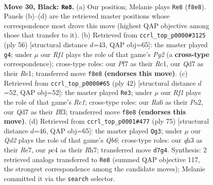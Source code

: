\documentclass[11pt]{article}
\begin{document}
\clearpage

\begin{figure}[p]\centering
\begin{subfigure}{0.46\textwidth}\centering
\resizebox{\linewidth}{!}{%
\newchessgame
\chessboard[
  setfen={5rk1/2pq1p2/r6p/2p1p1p1/2P1P1P1/3P3Q/7K/1NB2R2 b - - 17 30},
  showmover=false,
  pgfstyle=straightmove, color=movearrow, markmove={f8-e8}
]}
\caption{}
\end{subfigure}\hfill
\begin{subfigure}{0.46\textwidth}\centering
\resizebox{\linewidth}{!}{%
\newchessgame
\chessboard[
  setfen={r3qk2/p5p1/np6/4bp2/1P2p2Q/P7/5PPP/2R1R1K1 w - - 0 29},
  showmover=false,
  pgfstyle=straightmove, color=movearrow, markmove={g2-g4}
]}
\caption{}
\end{subfigure}
\\[4pt]
\begin{subfigure}{0.46\textwidth}\centering
\resizebox{\linewidth}{!}{%
\newchessgame
\chessboard[
  setfen={1k1r4/1pqb2pp/p4p2/3p4/3Q1PP1/2P2B2/PP5P/1K2R3 w - - 1 22},
  showmover=false,
  pgfstyle=straightmove, color=movearrow, markmove={e1-e3}
]}
\caption{}
\end{subfigure}\hfill
\begin{subfigure}{0.46\textwidth}\centering
\resizebox{\linewidth}{!}{%
\newchessgame
\chessboard[
  setfen={5k2/1p2rp1r/p5p1/3PP3/5QBp/1q5P/6P1/2R4K b - - 0 38},
  showmover=false,
  pgfstyle=straightmove, color=movearrow, markmove={b3-g3}
]}
\caption{}
\end{subfigure}
\caption{\textbf{Move 30, Black: \texttt{Re8}.} (a) Our position; Melanie plays \texttt{Re8} (\texttt{f8e8}). Panels (b)--(d) are the retrieved master positions whose correspondence most drove this move (highest QAP objective among those that transfer to it). (b) Retrieved from \texttt{ccrl\_top\_p0000\#3125} (ply 56) [structural distance $d$=43, QAP obj=65]: the master played \texttt{g4}; under $\mu$ our \emph{Rf1} plays the role of that game's \emph{Pg2} (a \textbf{cross-type} correspondence); cross-type roles: our \emph{P}f7 as their \emph{R}c1, our \emph{Q}d7 as their \emph{R}e1; transferred move \texttt{f8e8} \textbf{(endorses this move)}. (c) Retrieved from \texttt{ccrl\_top\_p0000\#65} (ply 42) [structural distance $d$=52, QAP obj=52]: the master played \texttt{Re3}; under $\mu$ our \emph{Rf1} plays the role of that game's \emph{Re1}; cross-type roles: our \emph{R}a6 as their \emph{P}a2, our \emph{Q}d7 as their \emph{B}f3; transferred move \texttt{f8e8} \textbf{(endorses this move)}. (d) Retrieved from \texttt{ccrl\_top\_p0001\#477} (ply 75) [structural distance $d$=46, QAP obj=65]: the master played \texttt{Qg3}; under $\mu$ our \emph{Qd2} plays the role of that game's \emph{Qb6}; cross-type roles: our \emph{q}h3 as their \emph{R}e7, our \emph{p}c4 as their \emph{R}h7; transferred move \texttt{d7g4}. Synthesis: 2 retrieved analogs transferred to \texttt{Re8} (summed QAP objective 117, the strongest correspondence among the candidate moves); Melanie committed it via the \texttt{search} selector.}
\label{fig:thought-m59}
\end{figure}
\end{document}
